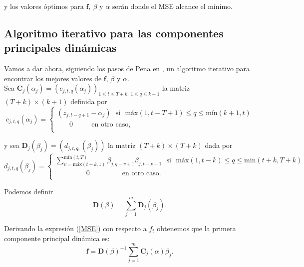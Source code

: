 y los valores óptimos para $\mathbf{f},\ \beta$ y $\alpha$ serán donde el MSE alcance el mínimo.\\

\subsection{Algoritmo iterativo para las componentes principales dinámicas}

Vamos a dar ahora, siguiendo los pasos de Pena en \cite{pena16}, un algoritmo iterativo para encontrar los mejores valores de $\mathbf{f}$, $\beta$ y $\alpha$.\\


Sea $\mathbf{C}_j(\alpha_j) = (c_{j,t,q}(\alpha_j))_{1 \leq t \leq T+k,\ 1 \leq q \leq k+1}$ la matriz $(T+k)\times (k+1)$ definida por 
\begin{equation*}
  c_{j,t,q}(\alpha_j) = 
  \left\lbrace
  \begin{array}{l}
     (z_{j,t-q+1} - \alpha_j)\ \ \ \text{si} \ \ \ \text{máx}(1, t-T+1) \leq q \leq \text{mín}(k+1,t) \\
     \ \ \ \ \ \ \ \ 0 \ \ \ \ \ \ \ \ \ \ \ \ \text{en otro caso}, \\
  \end{array}
  \right.
\end{equation*}

y sea $\mathbf{D}_j(\beta_j) = (d_{j,t,q,}(\beta_j))$ la matriz $(T+k) \times (T+k)$ dada por
\begin{equation*}
  d_{j,t,q}(\beta_j) = 
  \left\lbrace
  \begin{array}{l}
     \sum_{v=\text{máx}(t-k,1)}^{\text{mín}(t,T)} \beta_{j,q-v+1} \beta_{j,t-v+1} \ \ \ \text{si} \ \ \ \text{máx}(1, t-k) \leq q \leq \text{min}(t+k,T+k) \\
     \ \ \ \ \ \ \ \ \ \ \ \ \ \ \ \ \ \ \ \ 0 \ \ \ \ \ \ \ \ \ \ \ \ \ \ \ \ \ \ \ \ \ \text{en otro caso}. \\
  \end{array}
  \right.
\end{equation*}

Podemos definir 
\[	\mathbf{D}(\beta) = \sum_{j=1}^m \mathbf{D}_j(\beta_j).	\]

Derivando la expresión (\ref{MSE}) con respecto a $f_t$ obtenemos que la primera componente principal dinámica es: %
\begin{equation}\label{eq:deff}
	\mathbf{f} = \mathbf{D}(\beta)^{-1} \sum_{j=1}^m \mathbf{C}_j(\alpha)\beta_j.
\end{equation}

